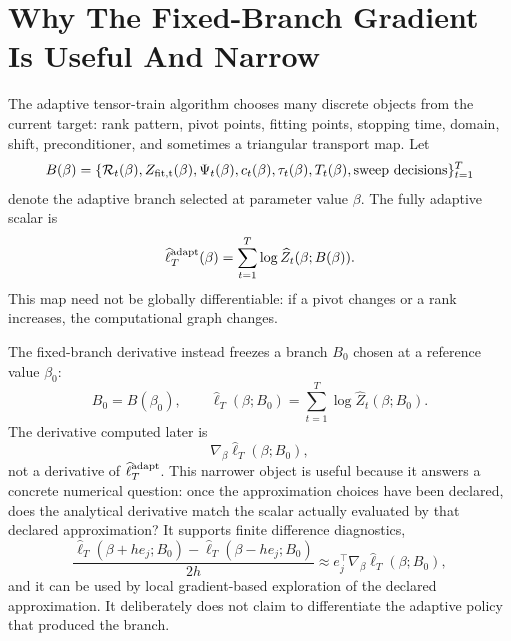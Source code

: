 \documentclass[11pt]{article}
\numberwithin{equation}{section}
\begin{document}
\section{Why The Fixed-Branch Gradient Is Useful And Narrow}

The adaptive tensor-train algorithm chooses many discrete objects from the
current target: rank pattern, pivot points, fitting points, stopping time,
domain, shift, preconditioner, and sometimes a triangular transport map.  Let
\begin{equation}
    B(\beta)
    =
    \{\mathcal R_t(\beta),Z_{\rm fit,t}(\beta),\Psi_t(\beta),
      c_t(\beta),\tau_t(\beta),T_t(\beta),\text{sweep decisions}\}_{t=1}^T
    \label{eq:p24-branch-adaptive}
\end{equation}
denote the adaptive branch selected at parameter value \(\beta\).  The fully
adaptive scalar is
\begin{equation}
    \widehat\ell_T^{\rm adapt}(\beta)
    =
    \sum_{t=1}^T
    \log \widehat Z_t(\beta;B(\beta)).
    \label{eq:p24-branch-adaptive-scalar}
\end{equation}
This map need not be globally differentiable: if a pivot changes or a rank
increases, the computational graph changes.

The fixed-branch derivative instead freezes a branch \(B_0\) chosen at a
reference value \(\beta_0\):
\begin{equation}
    B_0=B(\beta_0),
    \qquad
    \widehat\ell_T(\beta;B_0)
    =
    \sum_{t=1}^T
    \log \widehat Z_t(\beta;B_0).
    \label{eq:p24-branch-fixed-scalar}
\end{equation}
The derivative computed later is
\begin{equation}
    \nabla_\beta \widehat\ell_T(\beta;B_0),
    \label{eq:p24-branch-fixed-gradient}
\end{equation}
not a derivative of \(\widehat\ell_T^{\rm adapt}\).  This narrower object is
useful because it answers a concrete numerical question: once the approximation
choices have been declared, does the analytical derivative match the scalar
actually evaluated by that declared approximation?  It supports finite
difference diagnostics,
\begin{equation}
    \frac{\widehat\ell_T(\beta+h e_j;B_0)
          -\widehat\ell_T(\beta-h e_j;B_0)}
         {2h}
    \approx
    e_j^\top\nabla_\beta\widehat\ell_T(\beta;B_0),
    \label{eq:p24-branch-fd}
\end{equation}
and it can be used by local gradient-based exploration of the declared
approximation.  It deliberately does not claim to differentiate the adaptive
policy that produced the branch.
\end{document}
